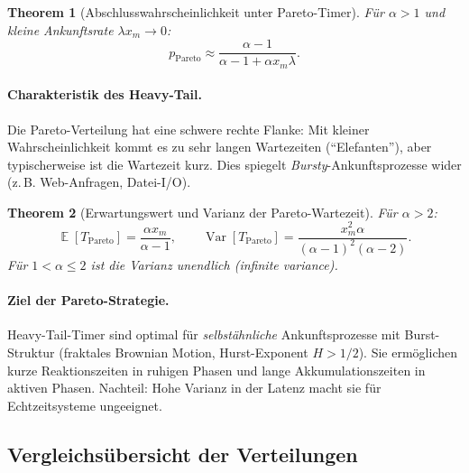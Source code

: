 ﻿\documentclass[12pt, a4paper]{article}
\newtheorem{theorem}{Theorem}[section]
\DeclareMathOperator{\E}{\mathbb{E}}
\DeclareMathOperator{\Var}{Var}
\newcommand{\Pareto}{\mathrm{Pareto}}
\begin{document}
\begin{theorem}[Abschlusswahrscheinlichkeit unter Pareto-Timer]
\label{thm:pareto}
Für $\alpha > 1$ und kleine Ankunftsrate $\lambda x_m \to 0$:
\[
  p_{\Pareto} \approx \frac{\alpha - 1}{\alpha - 1 + \alpha x_m \lambda}.
\]
\end{theorem}

\paragraph{Charakteristik des Heavy-Tail.}
Die Pareto-Verteilung hat eine schwere rechte Flanke: Mit kleiner
Wahrscheinlichkeit kommt es zu sehr langen Wartezeiten (``Elefanten''), aber
typischerweise ist die Wartezeit kurz. Dies spiegelt \emph{Bursty}-Ankunftsprozesse
wider (z.\,B. Web-Anfragen, Datei-I/O).

\begin{theorem}[Erwartungswert und Varianz der Pareto-Wartezeit]
\label{thm:paretoev}
Für $\alpha > 2$:
\[
  \E[T_{\Pareto}] = \frac{\alpha x_m}{\alpha-1}, \qquad
  \Var[T_{\Pareto}] = \frac{x_m^2 \alpha}{(\alpha-1)^2(\alpha-2)}.
\]
Für $1 < \alpha \leq 2$ ist die Varianz unendlich (\emph{infinite variance}).
\end{theorem}

\paragraph{Ziel der Pareto-Strategie.}
Heavy-Tail-Timer sind optimal für \emph{selbstähnliche} Ankunftsprozesse mit
Burst-Struktur (fraktales Brownian Motion, Hurst-Exponent $H > 1/2$). Sie
ermöglichen kurze Reaktionszeiten in ruhigen Phasen und lange Akkumulationszeiten
in aktiven Phasen. Nachteil: Hohe Varianz in der Latenz macht sie für
Echtzeitsysteme ungeeignet.

\subsection{Vergleichsübersicht der Verteilungen}
\end{document}
